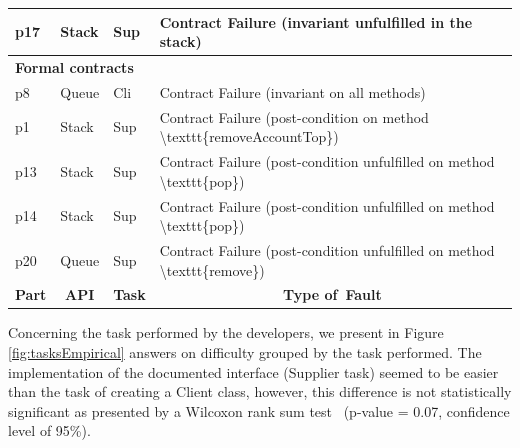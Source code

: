 \begin{table}
\begin{adjustbox}{width=\textwidth}
\begin{tabular}{|l|l|l|l|}
\hline
p17                                        & Stack                             & Sup                                & Contract Failure (invariant unfulfilled in the stack)                                     \\ 
\hline
\multicolumn{4}{|l|}{\textbf{Formal contracts} }                                                                                                                                                                \\ 
\hline
p8                                         & Queue                             & Cli                                & Contract Failure (invariant on all methods)                                               \\ 
\hline
p1                                         & Stack                             & Sup                                & Contract Failure (post-condition on method \textbackslash{}texttt\{removeAccountTop\})    \\ 
\hline
p13                                        & Stack                             & Sup                                & Contract Failure (post-condition unfulfilled on method \textbackslash{}texttt\{pop\})     \\ 
\hline
p14                                        & Stack                             & Sup                                & Contract Failure (post-condition unfulfilled on method \textbackslash{}texttt\{pop\})     \\ 
\hline
p20                                        & Queue                             & Sup                                & Contract Failure (post-condition unfulfilled on method \textbackslash{}texttt\{remove\})  \\ 
\hline\hline
\multicolumn{1}{|c|}{\textbf{Part}} & \multicolumn{1}{c|}{\textbf{API}} & \multicolumn{1}{c|}{\textbf{Task}} & \multicolumn{1}{c|}{\textbf{Type of~Fault}}                                               \\
\hline
\end{tabular}
\end{adjustbox}
\end{table}






Concerning the task performed by the developers, we present in
Figure \ref{fig:tasksEmpirical}
answers on difficulty grouped by the task performed.
The implementation of the documented interface (Supplier task) seemed to be easier
than the task of creating a Client class, however, this difference is not
statistically significant as presented by a Wilcoxon rank sum test~\cite{statistical}
(p-value = 0.07, confidence level of 95\%).
%

